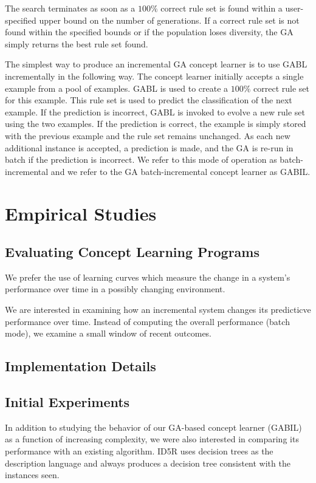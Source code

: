 \documentclass[12pt]{book}
\begin{document}
The search terminates as soon as a $100\%$ correct rule set is found within a user-specified upper bound on the number of generations. If a correct rule set is not found within the specified bounds or if the population loses diversity, the GA simply returns the best rule set found.

The simplest way to produce an incremental GA concept learner is to use GABL incrementally in the following way. The concept learner initially accepts a single example from a pool of examples. GABL is used to create a $100\%$ correct rule set for this example. This rule set is used to predict the classification of the next example. If the prediction is incorrect, GABL is invoked to evolve a new rule set using the two examples. If the prediction is correct, the example is simply stored with the previous example and the rule set remains unchanged. As each new additional instance is accepted, a prediction is made, and the GA is re-run in batch if the prediction is incorrect. We refer to this mode of operation as batch-incremental and we refer to the GA batch-incremental concept learner as GABIL.

\section{Empirical Studies}
\subsection{Evaluating Concept Learning Programs}
We prefer the use of learning curves which measure the change in a system's performance over time in a possibly changing environment.

We are interested in examining how an incremental system changes its predicticve performance over time. Instead of computing the overall performance (batch mode), we examine a small window of recent outcomes.

\subsection{Implementation Details}

\subsection{Initial Experiments}
In addition to studying the behavior of our GA-based concept learner (GABIL) as a function of increasing complexity, we were also interested in comparing its performance with an existing algorithm. ID5R uses decision trees as the description language and always produces a decision tree consistent with the instances seen.
\end{document}
